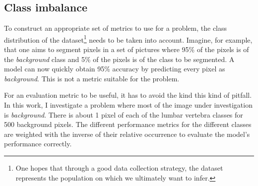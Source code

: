 \subsection{Class imbalance\label{sec:class_imbalance}}
\par{
    To construct an appropriate set of metrics to use for a problem, the class distribution of the dataset\footnote{
        One hopes that through a good data collection strategy, the dataset represents the population on which we ultimately want to infer.
        } needs to be taken into account.
    Imagine, for example, that one aims to segment pixels in a set of pictures where 95\% of the pixels is of the \textit{background} class and 5\% of the pixels is of the class to be segmented.
    A model can now quickly obtain 95\% accuracy by predicting every pixel as \textit{background}. This is not a metric suitable for the problem.
}
\par{
    For an evaluation metric to be useful, it has to avoid the kind this kind of pitfall.
    In this work, I investigate a problem where most of the image under investigation is \textit{background}. 
    There is about 1 pixel of each of the lumbar vertebra classes for 500 background pixels.
    The different performance metrics for the different classes are weighted with the inverse of their relative occurrence to evaluate the model's performance correctly.
}
